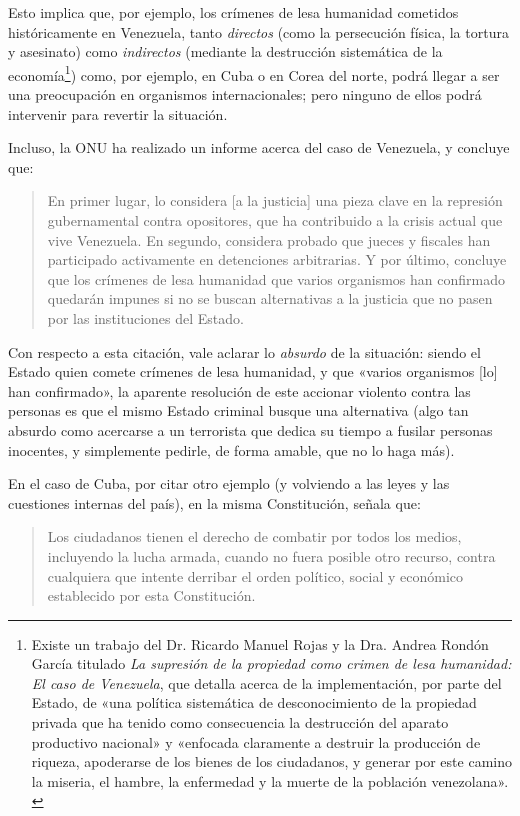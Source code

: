 \documentclass[12pt,a4paper,twoside]{book}
\begin{document}
Esto implica que, por ejemplo, los crímenes de lesa humanidad cometidos históricamente en Venezuela, tanto \textit{directos} (como la persecución física, la tortura y asesinato) como \textit{indirectos} (mediante la destrucción sistemática de la economía\footnote{Existe un trabajo del Dr. Ricardo Manuel Rojas y la Dra. Andrea Rondón García titulado \textit{La supresión de la propiedad como crimen de lesa humanidad: El caso de Venezuela}, que detalla acerca de la implementación, por parte del Estado, de «una política sistemática de desconocimiento de la propiedad privada que ha tenido como consecuencia la destrucción del aparato productivo nacional» y «enfocada claramente a destruir la producción de riqueza, apoderarse de los bienes de los ciudadanos, y generar por este camino la miseria, el hambre, la enfermedad y la muerte de la población venezolana». \cite{rojas:genocidio}}) como, por ejemplo, en Cuba o en Corea del norte, podrá llegar a ser una preocupación en organismos internacionales; pero ninguno de ellos podrá intervenir para revertir la situación.

Incluso, la ONU ha realizado un informe acerca del caso de Venezuela, y concluye que:

\begin{quotation}
En primer lugar, lo considera [a la justicia] una pieza clave en la represión gubernamental contra opositores, que ha contribuido a la crisis actual que vive Venezuela. En segundo, considera probado que jueces y fiscales han participado activamente en detenciones arbitrarias. Y por último, concluye que los crímenes de lesa humanidad que varios organismos han confirmado quedarán impunes si no se buscan alternativas a la justicia que no pasen por las instituciones del Estado. \cite{onu:venezuela}
\end{quotation}

Con respecto a esta citación, vale aclarar lo \textit{absurdo} de la situación: siendo el Estado quien comete crímenes de lesa humanidad, y que «varios organismos [lo] han confirmado», la aparente resolución de este accionar violento contra las personas es que el mismo Estado criminal busque una alternativa (algo tan absurdo como acercarse a un terrorista que dedica su tiempo a fusilar personas inocentes, y simplemente pedirle, de forma amable, que no lo haga más).

En el caso de Cuba, por citar otro ejemplo (y volviendo a las leyes y las cuestiones internas del país), en la misma Constitución, señala que:

\begin{quotation}
Los ciudadanos tienen el derecho de combatir por todos los medios, incluyendo la lucha armada, cuando no fuera posible otro recurso, contra cualquiera que intente derribar el orden político, social y económico establecido por esta Constitución. \cite[Art. 4]{cuba:constitucion}
\end{quotation}
\end{document}
